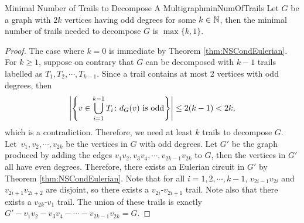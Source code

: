 \documentclass[math]{amznotes}
\theoremstyle{remark}
\begin{document}
\begin{probox}{Minimal Number of Trails to Decompose A Multigraph}{minNumOfTrails}
    Let $G$ be a graph with $2k$ vertices having odd degrees for some $k \in \mathbb{N}$, then the minimal number of trails needed to decompose $G$ is $\max\{k, 1\}$.
    \tcblower
    \begin{proof}
        The case where $k = 0$ is immediate by Theorem \ref{thm:NSCondEulerian}. For $k \geq 1$, suppose on contrary that $G$ can be decomposed with $k - 1$ trails labelled as $T_1, T_2, \cdots, T_{k - 1}$. Since a trail contains at most $2$ vertices with odd degrees, then
        \begin{equation*}
            {\left\lvert {\left\{v \in \bigcup_{i = 1}^{k - 1}T_i \colon d_G(v) \textrm{ is odd}\right\}} \right\rvert} \leq 2(k - 1) < 2k,
        \end{equation*}
        which is a contradiction. Therefore, we need at least $k$ trails to decompose $G$. Let~$v_1, v_2, \cdots, v_{2k}$ be the vertices in $G$ with odd degrees. Let $G'$ be the graph produced by adding the edges $v_1v_2, v_3v_4, \cdots, v_{2k - 1}v_{2k}$ to $G$, then the vertices in $G'$ all have even degrees. Therefore, there exists an Eulerian circuit in $G'$ by Theorem \ref{thm:NSCondEulerian}. Note that for all $i = 1, 2, \cdots, k - 1$, $v_{2i - 1}v_{2i}$ and $v_{2i + 1}v_{2i + 2}$ are disjoint, so there exists a $v_{2i}$-$v_{2i + 1}$ trail. Note also that there exists a $v_{2k}$-$v_1$ trail. The union of these trails is exactly~$G' - v_1v_2 - v_3v_4 - \cdots - v_{2k - 1}v_{2k} = G$.
    \end{proof}
\end{probox}
\end{document}
